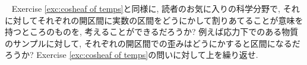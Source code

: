 \begin{exercise}~
\sexc Exercise \ref{exc:cosheaf of temps}と同様に, 読者のお気に入りの科学分野で, それに対してそれぞれの開区間に実数の区間をどうにかして割りあてることが意味を持つところのものを, 考えることができるだろうか? 例えば応力下でのある物質のサンプルに対して, それぞれの開区間での歪みはどうにかすると区間になるだろうか? 
\next Exercise \ref{exc:cosheaf of temps}の問いに対して上を繰り返せ.
\endsexc
\end{exercise}




